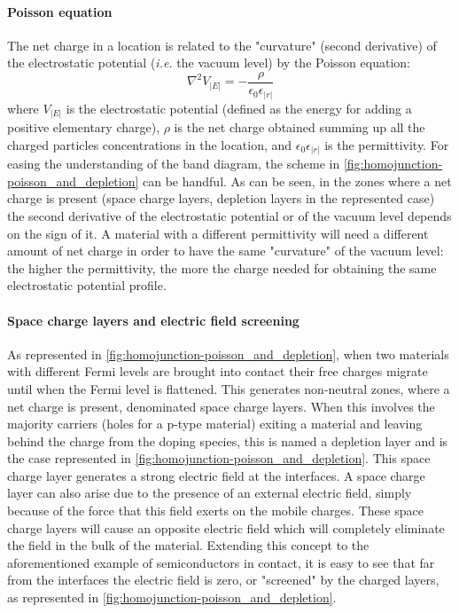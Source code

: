 		\paragraph{Poisson equation}
		The net charge in a location is related to the "curvature" (second derivative) of the electrostatic potential (\textsl{i.e.} the vacuum level) by the Poisson equation:
		\begin{equation}
			\nabla^2 V_|E| = -\frac{\rho}{\epsilon_0 \epsilon_|r|}
		\end{equation}
		where $V_|E|$ is the electrostatic potential (defined as the energy for adding a positive elementary charge), $\rho$ is the net charge obtained summing up all the charged particles concentrations in the location, and $\epsilon_0 \epsilon_|r|$ is the permittivity.
		For easing the understanding of the band diagram, the scheme in \cref{fig:homojunction-poisson_and_depletion} can be handful.
		As can be seen, in the zones where a net charge is present (space charge layers, depletion layers in the represented case) the second derivative of the electrostatic potential or of the vacuum level depends on the sign of it.
		A material with a different permittivity will need a different amount of net charge in order to have the same "curvature" of the vacuum level: the higher the permittivity, the more the charge needed for obtaining the same electrostatic potential profile.
	
		\paragraph{Space charge layers and electric field screening}\label{intro-space_charge}
		As represented in \cref{fig:homojunction-poisson_and_depletion}, when two materials with different Fermi levels are brought into contact their free charges migrate until when the Fermi level is flattened.
		This generates non-neutral zones, where a net charge is present, denominated space charge layers.
		When this involves the majority carriers (holes for a p-type material) exiting a material and leaving behind the charge from the doping species, this is named a depletion layer and is the case represented in \cref{fig:homojunction-poisson_and_depletion}.
		This space charge layer generates a strong electric field at the interfaces.
		A space charge layer can also arise due to the presence of an external electric field, simply because of the force that this field exerts on the mobile charges.
		These space charge layers will cause an opposite electric field which will completely eliminate the field in the bulk of the material.
		Extending this concept to the aforementioned example of semiconductors in contact, it is easy to see that far from the interfaces the electric field is zero, or "screened" by the charged layers, as represented in \cref{fig:homojunction-poisson_and_depletion}.
		
